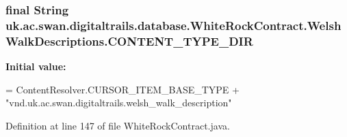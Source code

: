 \hypertarget{classuk_1_1ac_1_1swan_1_1digitaltrails_1_1database_1_1_white_rock_contract_1_1_welsh_walk_descriptions_aaaa739b13df8edb07583f4237aa7e7b1}{
\subsubsection[{C\+O\+N\+T\+E\+N\+T\+\_\+\+T\+Y\+P\+E\+\_\+\+D\+I\+R}]{\setlength{\rightskip}{0pt plus 5cm}final String uk.\+ac.\+swan.\+digitaltrails.\+database.\+White\+Rock\+Contract.\+Welsh\+Walk\+Descriptions.\+C\+O\+N\+T\+E\+N\+T\+\_\+\+T\+Y\+P\+E\+\_\+\+D\+I\+R\hspace{0.3cm}{\ttfamily [static]}}}\label{classuk_1_1ac_1_1swan_1_1digitaltrails_1_1database_1_1_white_rock_contract_1_1_welsh_walk_descriptions_aaaa739b13df8edb07583f4237aa7e7b1}
{\bfseries Initial value\+:}
\begin{DoxyCode}
= ContentResolver.CURSOR\_ITEM\_BASE\_TYPE +
                \textcolor{stringliteral}{"vnd.uk.ac.swan.digitaltrails.welsh\_walk\_description"}
\end{DoxyCode}


Definition at line 147 of file White\+Rock\+Contract.\+java.

